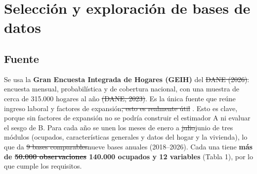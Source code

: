\documentclass[12pt,letterpaper]{article}
\providecommand{\DIFaddtex}[1]{{\protect\color{BLUE}#1}} %
\providecommand{\DIFdeltex}[1]{{\protect\color{RED}\sout{#1}}} %
\providecommand{\DIFaddtex}[1]{\texorpdfstring{\DIFaddtex{#1}}{#1}} %
\providecommand{\DIFdeltex}[1]{\texorpdfstring{\DIFdeltex{#1}}{}} %
\providecommand{\DIFaddbegin}{}\providecommand{\DIFaddend}{} %
\providecommand{\DIFdelbegin}{}\providecommand{\DIFdelend}{} %
\providecommand{\DIFadd}[1]{\texorpdfstring{\DIFaddtex{#1}}{#1}} %
\providecommand{\DIFdel}[1]{\texorpdfstring{\DIFdeltex{#1}}{}} %
\begin{document}
\section{Selección y exploración de bases de datos}

\subsection{Fuente}

Se usa la \textbf{Gran Encuesta Integrada de Hogares (GEIH)} del \DIFdelbegin \DIFdel{DANE (2026)}\DIFdelend \DIFaddbegin \DIFadd{\textcite{dane2026geih}}\DIFaddend : encuesta mensual, probabilística y de cobertura nacional, con una muestra de cerca de 315.000 hogares al año \DIFdelbegin \DIFdel{(DANE, 2023)}\DIFdelend \DIFaddbegin \parencite{dane2023metodologia}\DIFaddend . Es la única fuente que reúne ingreso laboral y factores de expansión\DIFdelbegin \DIFdel{, esto es realmente útil }\DIFdelend \DIFaddbegin \DIFadd{. Esto es clave, }\DIFaddend porque sin factores de expansión no se podría construir el estimador A ni evaluar el sesgo de B. Para cada año se unen los meses de enero a \DIFdelbegin \DIFdel{julio}\DIFdelend \DIFaddbegin \DIFadd{junio de tres módulos (ocupados, características generales y datos del hogar y la vivienda)}\DIFaddend , lo que da \DIFdelbegin \DIFdel{9 bases comparables}\DIFdelend \DIFaddbegin \DIFadd{nueve bases anuales (2018--2026)}\DIFaddend . Cada una tiene \textbf{más de \DIFdelbegin \DIFdel{50.000 observaciones }\DIFdelend \DIFaddbegin \DIFadd{140.000 ocupados }\DIFaddend y 12 variables} (Tabla 1), por lo que cumple los requisitos.
\end{document}
